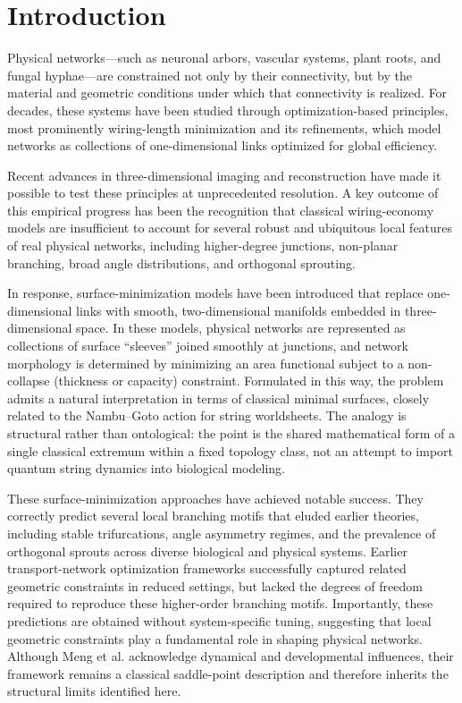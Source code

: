 \section{Introduction}

Physical networks---such as neuronal arbors, vascular systems, plant roots, and fungal hyphae---are constrained not only by their connectivity, but by the material and geometric conditions under which that connectivity is realized. For decades, these systems have been studied through optimization-based principles, most prominently wiring-length minimization and its refinements, which model networks as collections of one-dimensional links optimized for global efficiency.

Recent advances in three-dimensional imaging and reconstruction have made it possible to test these principles at unprecedented resolution. A key outcome of this empirical progress has been the recognition that classical wiring-economy models are insufficient to account for several robust and ubiquitous local features of real physical networks, including higher-degree junctions, non-planar branching, broad angle distributions, and orthogonal sprouting.

In response, surface-minimization models have been introduced that replace one-dimensional links with smooth, two-dimensional manifolds embedded in three-dimensional space. In these models, physical networks are represented as collections of surface ``sleeves'' joined smoothly at junctions, and network morphology is determined by minimizing an area functional subject to a non-collapse (thickness or capacity) constraint. Formulated in this way, the problem admits a natural interpretation in terms of classical minimal surfaces, closely related to the Nambu--Goto action for string worldsheets.\cite{Meng2026SurfaceOptimization}
The analogy is structural rather than ontological: the point is the shared mathematical form of a single classical extremum within a fixed topology class, not an attempt to import quantum string dynamics into biological modeling.

These surface-minimization approaches have achieved notable success. They correctly predict several local branching motifs that eluded earlier theories, including stable trifurcations, angle asymmetry regimes, and the prevalence of orthogonal sprouts across diverse biological and physical systems. Earlier transport-network optimization frameworks successfully captured related geometric constraints in reduced settings, but lacked the degrees of freedom required to reproduce these higher-order branching motifs.\cite{Katifori2010,Ronellenfitsch2015} Importantly, these predictions are obtained without system-specific tuning, suggesting that local geometric constraints play a fundamental role in shaping physical networks. Although Meng et al. acknowledge dynamical and developmental influences, their framework remains a classical saddle-point description and therefore inherits the structural limits identified here.

